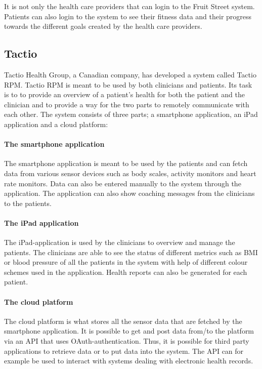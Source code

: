 \documentclass{cslthse-msc}
\begin{document}
It is not only the health care providers that can login to the Fruit Street system. Patients can also login to the system to see their fitness data and their progress towards the different goals created by the health care providers\cite{FruitStreetVideo}.

\subsection{Tactio}
Tactio Health Group, a Canadian company, has developed a system called Tactio RPM. Tactio RPM is meant to be used by both clinicians and patients. Its task is to to provide an overview of a patient's health for both the patient and the clinician and to provide a way for the two parts to remotely communicate with each other. The system consists of three parts; a smartphone application, an iPad application and a cloud platform: 

\paragraph{The smartphone application} The smartphone application is meant to be used by the patients and can fetch data from various sensor devices such as body scales, activity monitors and heart rate monitors. Data can also be entered manually to the system through the application. The application can also show coaching messages from the clinicians to the patients.

\paragraph{The iPad application} The iPad-application is used by the clinicians to overview and manage the patients. The clinicians are able to see the status of different metrics such as BMI or blood pressure of all the patients in the system with help of different colour schemes used in the application. Health reports can also be generated for each patient. 

\paragraph{The cloud platform} The cloud platform is what stores all the sensor data that are fetched by the smartphone application. It is possible to get and post data from/to the platform via an API that uses OAuth-authentication. Thus, it is possible for third party applications to retrieve data or to put data into the system. The API can for example be used to interact with systems dealing with electronic health records\cite{tactio2014}\cite{TactioWebsite}.
\end{document}
